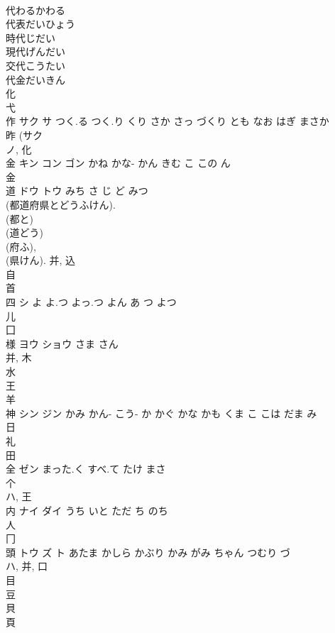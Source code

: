\documentclass[8pt]{extreport}
\begin{document}
\begin{CJK}{UTF8}{min}
\\	代わるかわる 
\\	代表だいひょう 
\\	時代じだい 
\\	現代げんだい 
\\	交代こうたい 
\\	代金だいきん 
\\	化 
\\	弋 
\\	作	サク サ	つく.る つく.り くり さか さっ づくり とも なお はぎ まさか	
\\	昨 (サク 
\\	ノ, 化 
\\	金	キン コン ゴン	かね かな- かん きむ こ この ん	
\\	金 
\\	道	ドウ トウ	みち さ じ ど みつ	
\\	(都道府県とどうふけん). 
\\	(都と) 
\\	(道どう) 
\\	(府ふ), 
\\	(県けん).		并, 込 
\\	自 
\\	首 
\\	四	シ	よ よ.つ よっ.つ よん あ つ よつ	
\\	儿 
\\	囗 
\\	様	ヨウ ショウ	さま さん	
\\	并, 木 
\\	水 
\\	王 
\\	羊 
\\	神	シン ジン	かみ かん- こう- か かぐ かな かも くま こ こは だま み	
\\	日 
\\	礼 
\\	田 
\\	全	ゼン	まった.く すべ.て たけ まさ	
\\	个 
\\	ハ, 王 
\\	内	ナイ ダイ	うち いと ただ ち のち	
\\	人 
\\	冂 
\\	頭	トウ ズ ト	あたま かしら かぶり かみ がみ ちゃん つむり づ	
\\	ハ, 并, 口 
\\	目 
\\	豆 
\\	貝 
\\	頁 

\end{CJK}
\end{document}
